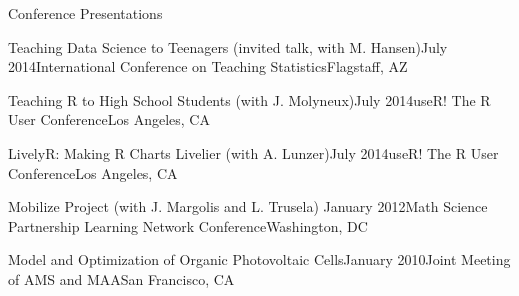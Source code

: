\documentclass{resume} %
\begin{document}
\begin{rSection}{Conference Presentations}
\begin{sSubsection}{Teaching Data Science to Teenagers}{ (invited talk, with M. Hansen)}{July 2014}{International Conference on Teaching Statistics}{Flagstaff, AZ}
\end{sSubsection}

\begin{sSubsection}{Teaching R to High School Students}{ (with J. Molyneux)}{July 2014}{useR! The R User Conference}{Los Angeles, CA}
\end{sSubsection}

\begin{sSubsection}{LivelyR: Making R Charts Livelier}{ (with A. Lunzer)}{July 2014}{useR! The R User Conference}{Los Angeles, CA}
\end{sSubsection}

\begin{sSubsection}{Mobilize Project}{ (with J. Margolis and L. Trusela)} {January 2012}{Math Science Partnership Learning Network Conference}{Washington, DC}
\end{sSubsection}

\begin{sSubsection}{Model and Optimization of Organic Photovoltaic Cells}{}{January 2010}{Joint Meeting of AMS and MAA}{San Francisco, CA}
\end{sSubsection}
\end{rSection}
\end{document}
